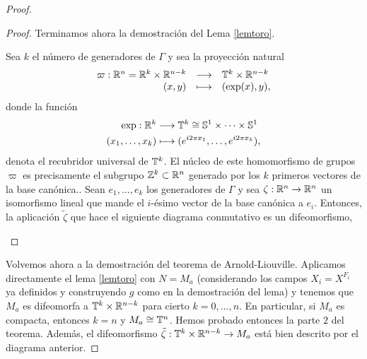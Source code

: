 \begin{proof}
\begin{proof}
Terminamos ahora la demostración del Lema \ref{lemtoro}.
 
  Sea $k$ el número de generadores de $\Gamma$ y sea la proyección natural
  \[
    \begin{array}{rcl}
      \varpi: \mathbb{R}^n = \mathbb{R}^k \times \mathbb{R}^{n-k} & \longrightarrow & \mathbb{T}^k \times \mathbb{R}^{n-k} \\
      (x,y) & \longmapsto & (\exp(x), y),
    \end{array}
  \]
  donde la función
  \begin{align*}
    \exp :\mathbb{R}^k&\longrightarrow \mathbb{T}^k \cong \mathbb{S}^1 \times \cdots \times \mathbb{S}^1\\ 
    (x_1,\dots,x_k) &\longmapsto (e^{i2\pi x_1},\dots,e^{i 2\pi x_k}), 
    \end{align*}
    denota el recubridor universal de $\mathbb{T}^k$.
  El núcleo de este homomorfismo de grupos $\varpi$ es precisamente el subgrupo $\mathbb{Z}^k\subset \mathbb{R}^n$ generado por los $k$ primeros vectores de la base canónica.. 
  Sean $e_1,\dots,e_k$ los generadores de $\Gamma$ y sea $\zeta:\mathbb{R}^n \rightarrow \mathbb{R}^n$ un isomorfismo lineal que mande el $i$-ésimo vector de la base canónica a $e_i$. Entonces, la aplicación $\tilde{\zeta}$ que hace el siguiente diagrama conmutativo es un difeomorfismo,
  \begin{center}
   \end{center}
\end{proof}

Volvemos ahora a la demostración del teorema de Arnold-Liouville. Aplicamos directamente el lema \ref{lemtoro} con $N=M_a$ (considerando los campos $X_i=X^{F_i}$ ya definidos y construyendo $g$ como en la demostración del lema) y tenemos que $M_a$ es difeomorfa a $\mathbb{T}^k\times \mathbb{R}^{n-k}$ para cierto $k=0,\dots,n$. En particular, si $M_a$ es compacta, entonces $k=n$ y $M_a\cong \mathbb{T}^n$. Hemos probado entonces la parte $2$ del teorema. Además, el difeomorfismo $\tilde{\zeta}:\mathbb{T}^k\times \mathbb{R}^{n-k} \rightarrow M_a$ está bien descrito por el diagrama anterior.


\end{proof}
